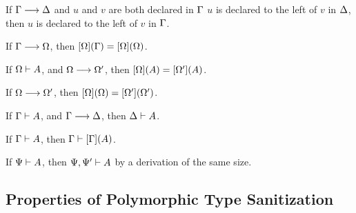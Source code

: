 \begin{lemma}
  \label{lemma:dunfield:ReverseDeclarationOrderPreservation}
  If $\Gamma \longrightarrow \Delta$ and $u$ and $v$ are both declared in $\Gamma$ $u$ is
  declared to the left of $v$ in $\Delta$,
  then $u$ is declared to the left of $v$ in $\Gamma$.
\end{lemma}

\begin{lemma}
  \label{lemma:dunfield:StabilityOfCompleteContexts}
  If $\Gamma \longrightarrow \Omega $,
  then $[\Omega](\Gamma) = [\Omega](\Omega) $.
\end{lemma}

\begin{lemma}
  \label{lemma:dunfield:FinishingTypes}
  If $\Omega \vdash A $,
  and $\Omega \longrightarrow \Omega' $,
  then $[\Omega](A) = [\Omega'](A) $.
\end{lemma}

\begin{lemma}
  \label{lemma:dunfield:FinishingCompletions}
  If $\Omega \longrightarrow \Omega' $,
  then $[\Omega](\Omega) = [\Omega'](\Omega') $.
\end{lemma}

\begin{lemma}
  \label{lemma:dunfield:ExtensionWeakening}
  If $\Gamma \vdash A$,
  and $\Gamma \longrightarrow \Delta$,
  then  $\Delta \vdash A$.
\end{lemma}

\begin{lemma}
  \label{lemma:dunfield:SubstitutionTyping}
  If $\Gamma \vdash A$,
  then  $\Gamma \vdash [\Gamma](A)$.
\end{lemma}

\begin{proposition}[Weakening]
  \label{lemma:dunfield:Weakening}
  If $\Psi \vdash A$,
  then  $\Psi, \Psi' \vdash A$ by a derivation of the same size.
\end{proposition}

\subsection{Properties of Polymorphic Type Sanitization}

\begin{lemma}[\PolymorphicTypeSanitizationExtensionName]\leavevmode
  \label{lemma:\PolymorphicTypeSanitizationExtensionName}
  \PolymorphicTypeSanitizationExtensionBody
\end{lemma}
\proof

